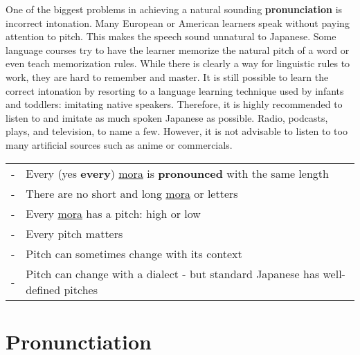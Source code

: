 One of the biggest problems in achieving a natural sounding
\textbf{pronunciation} is incorrect intonation. Many European or American
learners speak without paying attention to pitch. This makes the speech sound
unnatural to Japanese. Some language courses try to have the learner memorize
the natural pitch of a word or even teach memorization rules. While there is
clearly a way for linguistic rules to work, they are hard to remember and
master. It is still possible to learn the correct intonation by resorting to a
language learning technique used by infants and toddlers: imitating native
speakers. Therefore, it is highly recommended to listen to and imitate as much
spoken Japanese as possible. Radio, podcasts, plays, and television, to name a
few. However, it is not advisable to listen to too many artificial sources such
as anime or commercials.

\bigskip
\begin{tabular}{rl}
-&Every (yes \textbf{every}) \hyperref[sec:Mora]{mora} is \textbf{pronounced}
  with the same length\\
-&There are no short and long \hyperref[sec:Mora]{mora} or letters\\
-&Every \hyperref[sec:Mora]{mora} has a pitch: high or low\\
-&Every pitch matters\\
-&Pitch can sometimes change with its context\\
-&Pitch can change with a dialect - but standard Japanese has well-defined
  pitches\\
\end{tabular}

\bigskip

\section{Pronunctiation}


